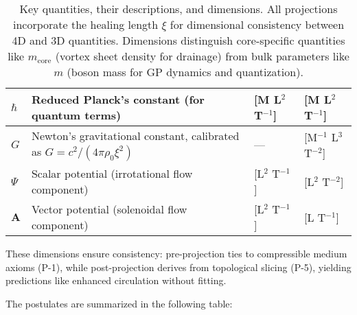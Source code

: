 \begin{table}[H]
\begin{tabularx}{\textwidth}{|l|Y|l|l|}
\hline
$\hbar$ & Reduced Planck's constant (for quantum terms) & [M L$^2$ T$^{-1}$] & [M L$^2$ T$^{-1}$] \\
\hline
$G$ & Newton's gravitational constant, calibrated as $G = c^2 / (4\pi \rho_0 \xi^2)$ & --- & [M$^{-1}$ L$^3$ T$^{-2}$] \\
\hline
$\Psi$ & Scalar potential (irrotational flow component) & [L$^2$ T$^{-1}$] & [L$^2$ T$^{-2}$] \\
\hline
$\mathbf{A}$ & Vector potential (solenoidal flow component) & [L$^2$ T$^{-1}$] & [L T$^{-1}$] \\
\hline
\end{tabularx}
\caption{Key quantities, their descriptions, and dimensions. All projections incorporate the healing length $\xi$ for dimensional consistency between 4D and 3D quantities. Dimensions distinguish core-specific quantities like $m_{\text{core}}$ (vortex sheet density for drainage) from bulk parameters like $m$ (boson mass for GP dynamics and quantization).\protect\footnotemark}
\label{tab:notation}
\end{table}

These dimensions ensure consistency: pre-projection ties to compressible medium axioms (P-1), while post-projection derives from topological slicing (P-5), yielding predictions like enhanced circulation without fitting.

The postulates are summarized in the following table:

